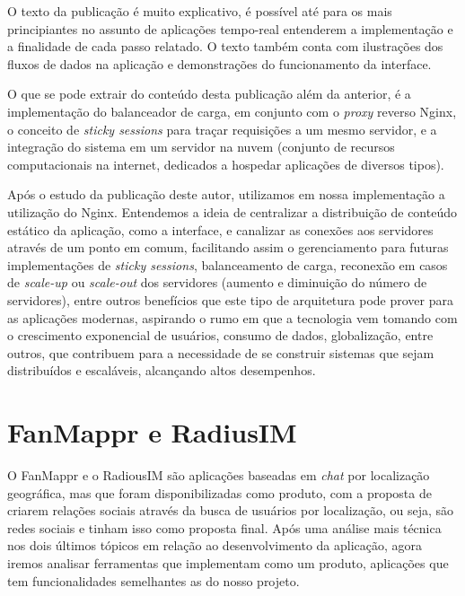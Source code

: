 O texto da publicação é muito explicativo, é possível até para os mais principiantes no assunto de aplicações tempo-real entenderem a implementação e a finalidade de cada passo relatado. O texto também conta com ilustrações dos fluxos de dados na aplicação e demonstrações do funcionamento da interface.

O que se pode extrair do conteúdo desta publicação além da anterior, é a implementação do balanceador de carga, em conjunto com o \textit{proxy} reverso Nginx, o conceito de \textit{sticky sessions} para traçar requisições a um mesmo servidor, e a integração do sistema em um servidor na nuvem (conjunto de recursos computacionais na internet, dedicados a hospedar aplicações de diversos tipos). 

Após o estudo da publicação deste autor, utilizamos em nossa implementação a utilização do Nginx. Entendemos a ideia de centralizar a distribuição de conteúdo estático da aplicação, como a interface, e canalizar as conexões aos servidores através de um ponto em comum, facilitando assim o gerenciamento para futuras implementações de \textit{sticky sessions}, balanceamento de carga, reconexão em casos de \textit{scale-up} ou \textit{scale-out} dos servidores (aumento e diminuição do número de servidores), entre outros benefícios que este tipo de arquitetura pode prover para as aplicações modernas, aspirando o rumo em que a tecnologia vem tomando com o crescimento exponencial de usuários, consumo de dados, globalização, entre outros, que contribuem para a necessidade de se construir sistemas que sejam distribuídos e escaláveis, alcançando altos desempenhos.

\section{FanMappr e RadiusIM}
O FanMappr \cite{fanmappr} e o RadiousIM \cite{radiusim} são aplicações baseadas em \textit{chat} por localização geográfica, mas que foram disponibilizadas como produto, com a proposta de criarem relações sociais através da busca de usuários por localização, ou seja, são redes sociais e tinham isso como proposta final. Após uma análise mais técnica nos dois últimos tópicos em relação ao desenvolvimento da aplicação, agora iremos analisar ferramentas que implementam como um produto, aplicações que tem funcionalidades semelhantes as do nosso projeto.  

